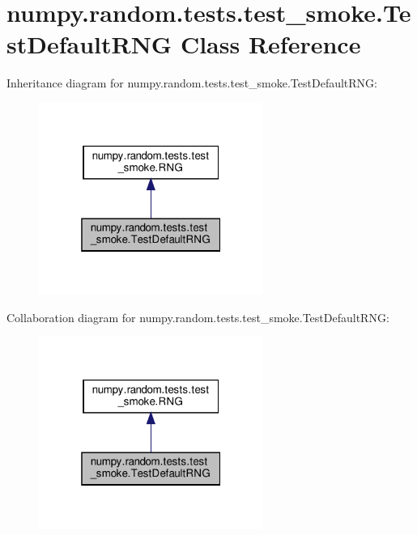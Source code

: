 \hypertarget{classnumpy_1_1random_1_1tests_1_1test__smoke_1_1TestDefaultRNG}{}\section{numpy.\+random.\+tests.\+test\+\_\+smoke.\+Test\+Default\+R\+NG Class Reference}
\label{classnumpy_1_1random_1_1tests_1_1test__smoke_1_1TestDefaultRNG}


Inheritance diagram for numpy.\+random.\+tests.\+test\+\_\+smoke.\+Test\+Default\+R\+NG\+:
\nopagebreak
\begin{figure}[H]
\begin{center}
\leavevmode
\includegraphics[width=208pt]{classnumpy_1_1random_1_1tests_1_1test__smoke_1_1TestDefaultRNG__inherit__graph}
\end{center}
\end{figure}


Collaboration diagram for numpy.\+random.\+tests.\+test\+\_\+smoke.\+Test\+Default\+R\+NG\+:
\nopagebreak
\begin{figure}[H]
\begin{center}
\leavevmode
\includegraphics[width=208pt]{classnumpy_1_1random_1_1tests_1_1test__smoke_1_1TestDefaultRNG__coll__graph}
\end{center}
\end{figure}
